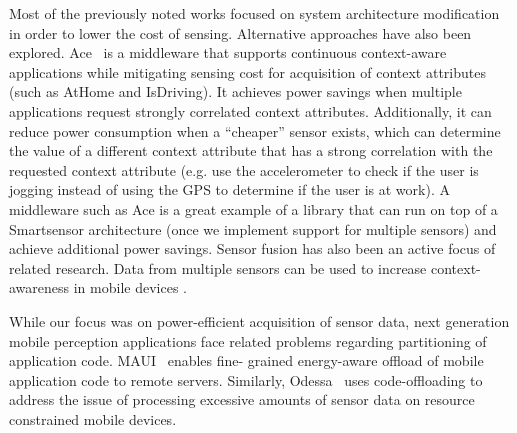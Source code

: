 Most of the previously noted works focused on system architecture 
modification in order to lower the cost of sensing. Alternative 
approaches have also been explored. Ace~\cite{ace} is a middleware that 
supports continuous context-aware applications while mitigating sensing 
cost for acquisition of context attributes (such as AtHome and IsDriving). 
It achieves power savings when multiple applications request strongly 
correlated context attributes. Additionally, it can reduce power 
consumption when a ``cheaper'' sensor exists, which can determine the 
value of a different context attribute that has a strong correlation with 
the requested context attribute (e.g. use the accelerometer to check if 
the user is jogging instead of using the GPS to determine if the user is 
at work). A middleware such as Ace is a great example of a library that 
can run on top of a Smartsensor architecture (once we implement support 
for multiple sensors) and achieve additional power savings. Sensor fusion 
has also been an active focus of related research. Data from multiple 
sensors can be used to increase context-awareness in mobile devices 
\cite{gellersen2002multi,biegel2004framework}.

While our focus was on power-efficient acquisition of sensor data, next 
generation mobile perception applications face related problems regarding 
partitioning of application code. MAUI~\cite{maui} enables fine-
grained energy-aware offload of mobile application code to remote 
servers. Similarly, Odessa~\cite{ra2011odessa} uses code-offloading to 
address the issue of processing excessive amounts of sensor data on 
resource constrained mobile devices.